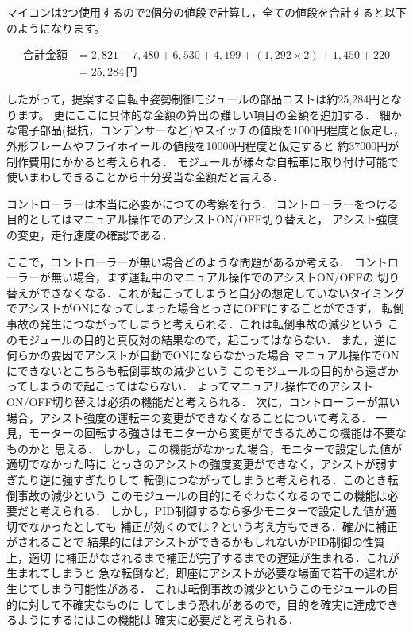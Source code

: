 \documentclass[uplatex,dvipdfmx]{jsarticle}
\begin{document}
マイコンは2つ使用するので2個分の値段で計算し，全ての値段を合計すると以下のようになります。

\begin{align*}
\text{合計金額} &= 2,821 + 7,480 + 6,530 + 4,199 + (1,292 \times 2) + 1,450 + 220 \\
&= 25,284 \, \text{円}
\end{align*}

したがって，提案する自転車姿勢制御モジュールの部品コストは約25,284円となります。
更にここに具体的な金額の算出の難しい項目の金額を追加する．
細かな電子部品(抵抗，コンデンサーなど)やスイッチの値段を1000円程度と仮定し，
外形フレームやフライホイールの値段を10000円程度と仮定すると
約37000円が制作費用にかかると考えられる．
モジュールが様々な自転車に取り付け可能で使いまわしできることから十分妥当な金額だと言える．


コントローラーは本当に必要かにつての考察を行う．
コントローラーをつける目的としてはマニュアル操作でのアシストON/OFF切り替えと，
アシスト強度の変更，走行速度の確認である．

ここで，コントローラーが無い場合どのような問題があるか考える．
コントローラーが無い場合，まず運転中のマニュアル操作でのアシストON/OFFの
切り替えができなくなる．これが起こってしまうと自分の想定していないタイミング
でアシストがONになってしまった場合とっさにOFFにすることができず，
転倒事故の発生につながってしまうと考えられる．これは転倒事故の減少という
このモジュールの目的と真反対の結果なので，起こってはならない．
また，逆に何らかの要因でアシストが自動でONにならなかった場合
マニュアル操作でONにできないとこちらも転倒事故の減少という
このモジュールの目的から遠ざかってしまうので起こってはならない．
よってマニュアル操作でのアシストON/OFF切り替えは必須の機能だと考えられる．
次に，コントローラーが無い場合，アシスト強度の運転中の変更ができなくなることについて考える．
一見，モーターの回転する強さはモニターから変更ができるためこの機能は不要なものかと
思える．
しかし，この機能がなかった場合，モニターで設定した値が適切でなかった時に
とっさのアシストの強度変更ができなく，アシストが弱すぎたり逆に強すぎたりして
転倒につながってしまうと考えられる．このとき転倒事故の減少という
このモジュールの目的にそぐわなくなるのでこの機能は必要だと考えられる．
しかし，PID制御するなら多少モニターで設定した値が適切でなかったとしても
補正が効くのでは？という考え方もできる．確かに補正がされることで
結果的にはアシストができるかもしれないがPID制御の性質上，適切
に補正がなされるまで補正が完了するまでの遅延が生まれる．これが生まれてしまうと
急な転倒など，即座にアシストが必要な場面で若干の遅れが生じてしまう可能性がある．
これは転倒事故の減少というこのモジュールの目的に対して不確実なものに
してしまう恐れがあるので，目的を確実に達成できるようにするにはこの機能は
確実に必要だと考えられる．
\end{document}
